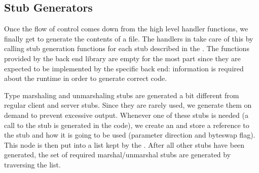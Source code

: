 \subsection{Stub Generators}
\label{subsec:BE:Stub Generators}

Once the flow of control comes down from the high level handler functions, we
finally get to generate the contents of a file.  The handlers in
 take care of this by calling stub generation
functions for each stub described in the \PRESC{}.  The functions provided by
the back end library are empty for the most part since they are expected to be
implemented by the specific back end: information is required about the runtime
in order to generate correct code.

Type marshaling and unmarshaling stubs are generated a bit different from
regular client and server stubs.  Since they are rarely used, we generate them
on demand to prevent excessive output.  Whenever one of these stubs is needed
(a call to the stub is generated in the code), we create an
 and store a reference to the stub and how it is
going to be used (parameter direction and byteswap flag).  This node is then
put into a list kept by the .  After all other stubs have been
generated, the set of required marshal/unmarshal stubs are generated by
traversing the list.

